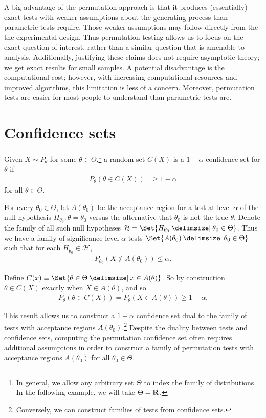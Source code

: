 A big advantage of the permutation approach is that it produces (essentially) exact 
tests with weaker assumptions 
about the generating process than parametric tests require.
Those weaker assumptions may follow directly from the 
the experimental design.  Thus
permutation testing allows us to focus on the exact question of interest,
rather than a similar question that is amenable to analysis.  Additionally,
justifying these claims does not require asymptotic theory; 
we get exact results for small samples.  A potential disadvantage is the
computational cost; however, with increasing computational resources and
improved algorithms, this limitation is less of a concern.
Moreover, permutation tests are easier for most people to understand than
parametric tests are.

\section{Confidence sets}

Given $X \sim P_\theta$ for some $\theta \in \Theta$,\footnote{In general, we allow any
arbitrary set $\Theta$ to index the family of distributions. In the following example, we will take $\Theta =\mathbf{R}$.} a random set
$C(X)$ is a $1 - \alpha$ confidence set for $\theta$ if
\begin{align*}
P_\theta(\theta \in C(X)) &\ge 1 - \alpha
\end{align*}
for all $\theta \in \Theta$.

For every $\theta_0 \in \Theta$, let $A(\theta_0)$ be the acceptance region for
a test at level $\alpha$ of the null hypothesis $H_{\theta_0}: \theta =
\theta_0$ versus the alternative that $\theta_0$ is not the true $\theta$.
Denote the family of all such null hypotheses $\mathcal{H} = \Set{H_{\theta_0}
\given \theta_0 \in \Theta}$.  Thus we have a family of significance-level
$\alpha$ tests $\Set{A(\theta_0) \given \theta_0 \in \Theta}$ such that for
each $H_{\theta_0} \in \mathcal{H}$,
\begin{align*}
P_{\theta_0}(X \notin A(\theta_0)) \le \alpha.
\end{align*}

Define $C(x) \equiv \Set{\theta \in \Theta \given x \in A(\theta)}$.
So by construction $\theta \in C(X)$ exactly when $X \in A(\theta)$, and so
\begin{align*}
P_{\theta}(\theta \in C(X)) = P_{\theta}(X \in A(\theta)) \ge 1 - \alpha.
\end{align*}

This result allows us to construct a $1-\alpha$ confidence set dual to
the family of tests with acceptance regions $A(\theta_0)$.\footnote{Conversely,
we can construct families of tests from confidence sets.}  Despite the duality
between tests and confidence sets, computing the permutation confidence set
often requires additional assumptions in order to construct a family of
permutation tests with acceptance regions $A(\theta_0)$ for all $\theta_0 \in
\Theta$.

